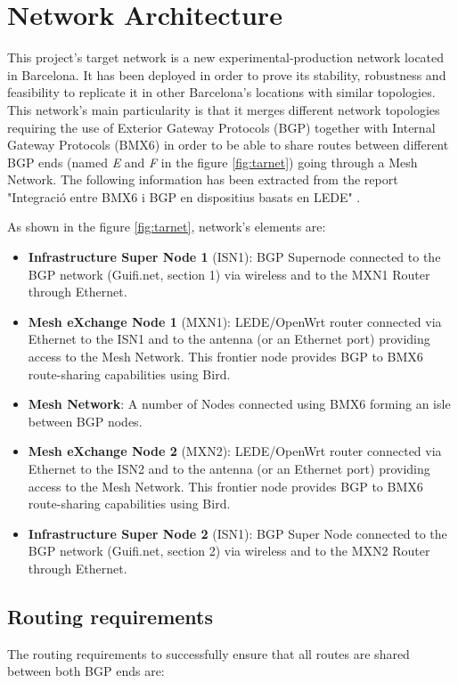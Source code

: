 \chapter{Network Architecture}
\label{ch:architecture}

This project's target network is a new experimental-production network located in Barcelona. It has been deployed in order to prove its stability, robustness and feasibility to replicate it in other Barcelona's locations with similar topologies. This network's main particularity is that it merges different network topologies requiring the use of Exterior Gateway Protocols (BGP) together with Internal Gateway Protocols (BMX6) in order to be able to share routes between different BGP ends (named \textit{E} and \textit{F} in the figure \ref{fig:tarnet}) going through a Mesh Network. The following information has been extracted from the report "Integració entre BMX6 i BGP en dispositius basats en LEDE" \cite{bgpbmx6}.

As shown in the figure \ref{fig:tarnet}, network's elements are:
\begin{itemize}
    \item \textbf{Infrastructure Super Node 1} (ISN1): BGP Supernode connected to the BGP network (Guifi.net, section 1) via wireless and to the MXN1 Router through Ethernet.     
    \item \textbf{Mesh eXchange Node 1} (MXN1): LEDE/OpenWrt router connected via Ethernet to the ISN1 and to the antenna (or an Ethernet port) providing access to the Mesh Network. This frontier node provides BGP to BMX6 route-sharing capabilities using Bird.
    \item \textbf{Mesh Network}: A number of Nodes connected using BMX6 forming an isle between BGP nodes.
    \item \textbf{Mesh eXchange Node 2} (MXN2): LEDE/OpenWrt router connected via Ethernet to the ISN2 and to the antenna (or an Ethernet port) providing access to the Mesh Network. This frontier node provides BGP to BMX6 route-sharing capabilities using Bird.
    \item \textbf{Infrastructure Super Node 2} (ISN1): BGP Super Node connected to the BGP network (Guifi.net, section 2) via wireless and to the MXN2 Router through Ethernet.
\end{itemize}


\section{Routing requirements}
The routing requirements to successfully ensure that all routes are shared between both BGP ends are:

